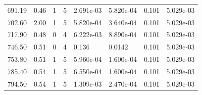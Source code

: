 \documentclass[preview]{standalone}
\begin{document}
{{\begin{tabular}{L{1.2cm}C{1.2cm} C{0.3cm}C{0.5cm} C{1.4cm}C{1.4cm} C{1.4cm}C{1.4cm}}
  691.19  &  0.46  & 1     &  5 &  2.691e-03  & 5.820e-04  & 0.101 &  5.029e-03   \\ 
  702.60  &  2.00  & 1     &  5 &  5.820e-04  & 3.640e-04  & 0.101 &  5.029e-03   \\ 
  717.90  &  0.48  & 0     &  4 &  6.222e-03  & 8.890e-04  & 0.101 &  5.029e-03   \\ 
  746.50  &  0.51  & 0     &  4 &  0.136  & 0.0142  & 0.101 &  5.029e-03   \\ 
  753.80  &  0.51  & 1     &  5 &  5.960e-04  & 1.600e-04  & 0.101 &  5.029e-03   \\ 
  785.40  &  0.54  & 1     &  5 &  6.550e-04  & 1.600e-04  & 0.101 &  5.029e-03   \\ 
  794.50  &  0.54  & 1     &  5 &  1.309e-03  & 2.470e-04  & 0.101 &  5.029e-03   \\ 
\hline 
\end{tabular} 

}}
\end{document}

